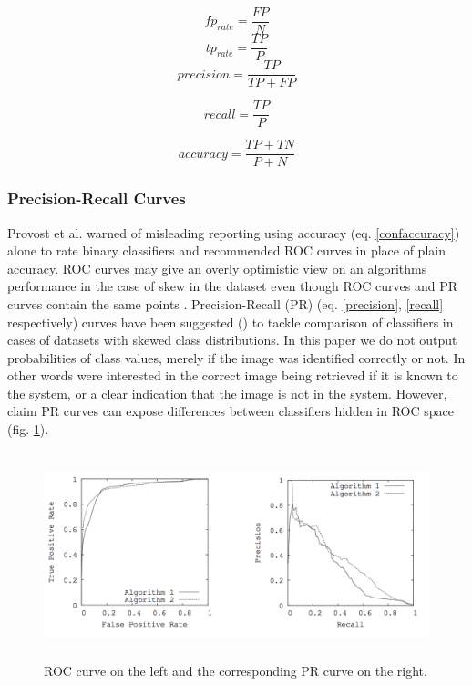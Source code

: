 \documentclass[english,12pt,a4paper,pdftex,elec,utf8]{aaltothesis}
\begin{document}
\begin{equation}\label{FPR}
fp_{rate} = \frac{FP}{N}
\end{equation}
\begin{equation}\label{TPR}
tp_{rate} = \frac{TP}{P}
\end{equation}
\begin{equation}\label{precision}
precision = \frac{TP}{TP + FP}
\end{equation}

\begin{equation}\label{recall}
recall = \frac{TP}{P}
\end{equation}

\begin{equation}\label{confaccuracy}
accuracy = \frac{TP + TN}{P + N}
\end{equation}

\subsubsection{Precision-Recall Curves}
Provost et al. warned of misleading reporting using accuracy (eq. \ref{confaccuracy}) alone to rate binary classifiers \cite{Provost1997} and recommended ROC curves in place of plain accuracy. ROC curves may give an overly optimistic view on an algorithms performance in the case of skew in the dataset even though ROC curves and PR curves contain the same points \cite{Davis2006}. Precision-Recall (PR) (eq. \ref{precision}, \ref{recall} respectively) curves have been suggested (\cite{craven2005markov}) to tackle comparison of classifiers in cases of datasets with skewed class distributions. In this paper we do not output probabilities of class values, merely if the image was identified correctly or not. In other words were interested in the correct image being retrieved if it is known to the system, or a clear indication that the image is not in the system. However, \cite{Davis2006} claim PR curves can expose differences between classifiers hidden in ROC space (fig. \ref{rocpr}).

\begin{figure}[htb]
\begin{center}
\includegraphics[height=6cm]{figures/rocpr}
\end{center}
\caption{ROC curve on the left and the corresponding PR curve on the right. \cite{Davis2006}}
\label{rocpr}
\end{figure}
\end{document}
